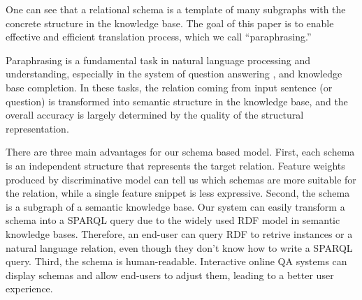 %
%
One can see that a relational schema is a template of many subgraphs 
with the concrete structure in the knowledge base.
The goal of this paper is to enable effective and efficient translation 
process, which we call ``paraphrasing.'' 




Paraphrasing is a fundamental task in natural language processing and understanding,
especially in the system of question answering , 
and knowledge base completion.
In these tasks, the relation coming from input sentence (or question) is transformed 
into semantic structure in the knowledge base, and the overall accuracy is largely 
determined by the quality of the structural representation.


There are three main advantages for our schema based model.
First, each schema is an independent structure that represents the target relation.
Feature weights produced by discriminative model can tell us which schemas are more
suitable for the relation, while a single feature snippet is less expressive.
Second, the schema is a subgraph of a semantic knowledge base. 
Our system can easily transform a schema into a SPARQL query due to the widely used RDF model
in semantic knowledge bases. Therefore, an end-user can query RDF to retrive instances
or a natural language relation, even though they don't know how to write a SPARQL query.
Third, the schema is human-readable. Interactive online QA systems can display schemas and
allow end-users to adjust them, leading to a better user experience. 



